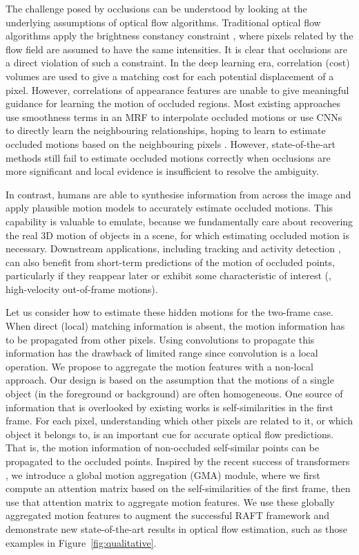 \documentclass[10pt,twocolumn,letterpaper]{article}
\begin{document}
The challenge posed by occlusions can be understood by looking at the underlying
assumptions of optical flow algorithms.
Traditional optical flow algorithms apply the brightness constancy constraint \cite{horn},
where pixels related by the flow field are assumed to have the same intensities.
It is clear that occlusions are a direct violation of such a constraint. 
In the deep learning era, correlation (cost) volumes \cite{hosni2012fast} are used to give
a matching cost for each potential displacement of a pixel. However, correlations of appearance
features are unable to give meaningful guidance for learning the motion of occluded regions.
Most existing approaches use smoothness terms in an MRF to interpolate 
occluded motions \cite{fullflow} or use CNNs to directly learn the neighbouring relationships,
hoping to learn to estimate occluded motions based on the neighbouring pixels \cite{raft, pwcnet}.
However, state-of-the-art methods still fail to estimate occluded motions correctly when 
occlusions are more significant and local evidence is insufficient to resolve the ambiguity.

In contrast, humans are able to synthesise information from across the image and apply plausible
motion models to accurately estimate occluded motions. This capability is valuable to emulate,
because we fundamentally care about recovering the real 3D motion of objects in a scene, for which
estimating occluded motion is necessary. Downstream applications, including tracking and activity
detection \cite{tracking}, can also benefit from short-term predictions of the motion of occluded points, particularly
if they reappear later or exhibit some characteristic of interest (\eg, high-velocity out-of-frame motions).

Let us consider how to estimate these hidden motions for the two-frame case. When direct (local)
matching information is absent, the motion information has to be propagated from other pixels.
Using convolutions to propagate this information has the drawback of limited range since
convolution is a local operation.
We propose to aggregate the motion features with a non-local approach. Our design is based on the
assumption that the motions of a single object (in the foreground or background) are often homogeneous. 
One source of information that is overlooked by existing works is self-similarities
in the first frame. For each pixel, understanding which other pixels are related to it,
or which object it belongs to, is
an important cue for accurate optical flow predictions.
That is, the motion information of non-occluded self-similar points can be propagated to the occluded points.
Inspired by the recent success of transformers \cite{transformer}, we introduce a 
global motion aggregation (GMA) module, where we first compute an attention matrix based on the 
self-similarities of the first frame, then use that attention matrix to aggregate motion features.
We use these globally aggregated motion features to augment the successful RAFT \cite{raft} framework
and demonstrate new state-of-the-art results in optical flow estimation, such as those examples in Figure~\ref{fig:qualitative}.
\end{document}
